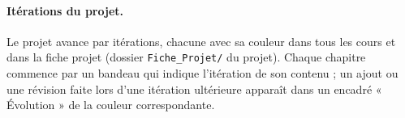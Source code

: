 \documentclass[11pt,a4paper]{report}
\begin{document}
\paragraph{Itérations du projet.} Le projet avance par itérations, chacune avec sa couleur dans tous les cours et dans la fiche projet (dossier \texttt{Fiche\_Projet/} du projet). Chaque chapitre commence par un bandeau qui indique l'itération de son contenu ; un ajout ou une révision faite lors d'une itération ultérieure apparaît dans un encadré « Évolution » de la couleur correspondante.
\legendeiterations

\tableofcontents
\cleardoublepage
{}












\appendix

\end{document}
